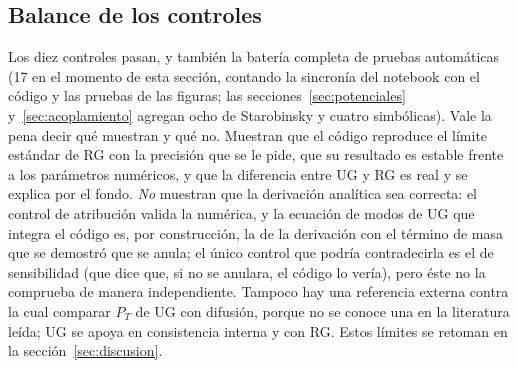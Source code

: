\subsection{Balance de los controles}

Los diez controles pasan, y también la batería completa de pruebas automáticas (17 en el momento de esta sección, contando la sincronía del notebook con el código y las pruebas de las figuras; las secciones~\ref{sec:potenciales} y~\ref{sec:acoplamiento} agregan ocho de Starobinsky y cuatro simbólicas). Vale la pena decir qué muestran y qué no. Muestran que el código reproduce el límite estándar de RG con la precisión que se le pide, que su resultado es estable frente a los parámetros numéricos, y que la diferencia entre UG y RG es real y se explica por el fondo. \emph{No} muestran que la derivación analítica sea correcta: el control de atribución valida la numérica, y la ecuación de modos de UG que integra el código es, por construcción, la de la derivación con el término de masa que se demostró que se anula; el único control que podría contradecirla es el de sensibilidad (que dice que, si no se anulara, el código lo vería), pero éste no la comprueba de manera independiente. Tampoco hay una referencia externa contra la cual comparar $P_T$ de UG con difusión, porque no se conoce una en la literatura leída; UG se apoya en consistencia interna y con RG. Estos límites se retoman en la sección~\ref{sec:discusion}.
